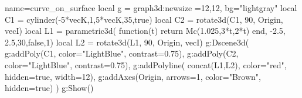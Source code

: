 \documentclass[border=5pt]{standalone}%
\begin{document}
\begin{luadraw}{name=curve_on_surface}
local g = graph3d:new{size ={12,12}, bg="lightgray"}
local C1 = cylinder(-5*vecK,1,5*vecK,35,true)
local C2 = rotate3d(C1, 90, {Origin, vecI})
local L1 = parametric3d( function(t) return Mc(1.025,3*t,2*t) end, -2.5, 2.5,30,false,1)
local L2 = rotate3d(L1, 90, {Origin, vecI})
g:Dscene3d(
    g:addPoly(C1, {color="LightBlue", contrast=0.75}), g:addPoly(C2, {color="LightBlue", contrast=0.75}),
    g:addPolyline( concat(L1,L2), {color="red", hidden=true, width=12}),
    g:addAxes(Origin, {arrows=1, color="Brown", hidden=true}) )
g:Show()
\end{luadraw}
\end{document}
